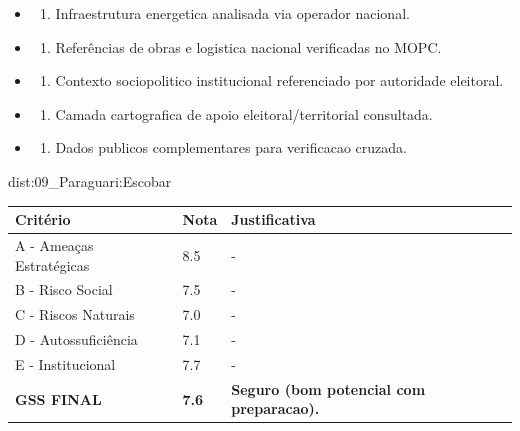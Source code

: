 {\begin{itemize}
\item
  \begin{enumerate}
  \def\labelenumi{\arabic{enumi})}
  \setcounter{enumi}{7}
  \tightlist
  \item
    Infraestrutura energetica analisada via operador nacional.
  \end{enumerate}
\item
  \begin{enumerate}
  \def\labelenumi{\arabic{enumi})}
  \setcounter{enumi}{8}
  \tightlist
  \item
    Referências de obras e logistica nacional verificadas no MOPC.
  \end{enumerate}
\item
  \begin{enumerate}
  \def\labelenumi{\arabic{enumi})}
  \setcounter{enumi}{9}
  \tightlist
  \item
    Contexto sociopolitico institucional referenciado por autoridade
    eleitoral.
  \end{enumerate}
\item
  \begin{enumerate}
  \def\labelenumi{\arabic{enumi})}
  \setcounter{enumi}{10}
  \tightlist
  \item
    Camada cartografica de apoio eleitoral/\allowbreak territorial consultada.
  \end{enumerate}
\item
  \begin{enumerate}
  \def\labelenumi{\arabic{enumi})}
  \setcounter{enumi}{11}
  \tightlist
  \item
    Dados publicos complementares para verificacao cruzada.
  \end{enumerate}
\end{itemize}}{dist:09_Paraguari:Escobar}
\begin{table}[ht!]
\small \begin{tabular}{p{3.0cm}p{0.8cm}p{6.0cm}} \toprule
\textbf{Critério} & \textbf{Nota} & \textbf{Justificativa} \\ \midrule
A - Ameaças Estratégicas & 8.5 & - \\
B - Risco Social & 7.5 & - \\
C - Riscos Naturais & 7.0 & - \\
D - Autossuficiência & 7.1 & - \\
E - Institucional & 7.7 & - \\
\midrule \textbf{GSS FINAL} & \textbf{7.6} & \textbf{Seguro (bom potencial com preparacao).} \\ \bottomrule \end{tabular}
\end{table}
